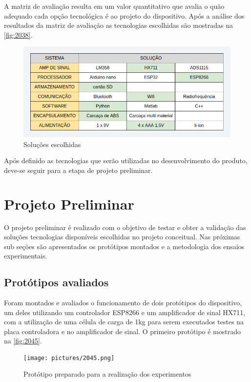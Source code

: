 A matriz de avaliação resulta em um valor quantitativo que avalia o quão adequado cada opção tecnológica é ao projeto do dispositivo.
Após a análise dos resultados da matriz de avaliação as tecnologias escolhidas são mostradas na \autoref{fig:2038}.

\begin{figure}[H]
	\caption{\label{fig:2038} Soluções escolhidas}
	\begin{center}
		\includegraphics[width=\textwidth]{pictures/2038.png}
	\end{center}
\end{figure}

Após definido as tecnologias que serão utilizadas no desenvolvimento do produto, deve-se seguir para a etapa de projeto preliminar.

\section{Projeto Preliminar}

O projeto preliminar é realizado com o objetivo de testar e obter a validação das soluções tecnologias disponíveis escolhidas no projeto conceitual.
Nas próximas sub seções são apresentados os protótipos montados e a metodologia dos ensaios experimentais.

\subsection{Protótipos avaliados}

Foram montados e avaliados o funcionamento de dois protótipos do dispositivo, um deles utilizando um controlador ESP8266 e um amplificador de sinal HX711,
com a utilização de uma célula de carga de 1kg para serem executados testes na placa controladora e no amplificador de sinal.
O primeiro protótipo é mostrado na \autoref{fig:2045}.

\begin{figure}[H]
	\caption{\label{fig:2045} Protótipo preparado para a realização dos experimentos}
		\begin{center}
			\texttt{[image: pictures/2045.png]}
		\end{center}
\end{figure}

